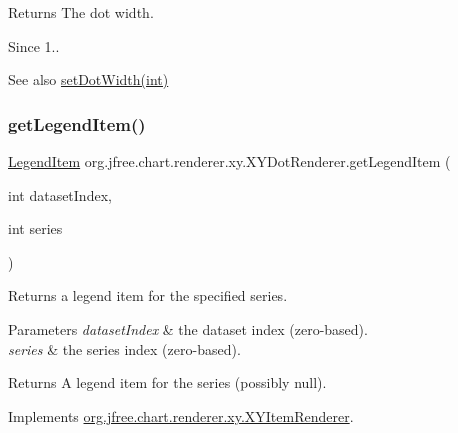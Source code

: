 \begin{DoxyReturn}{Returns}
The dot width.
\end{DoxyReturn}
\begin{DoxySince}{Since}
1.. 
\end{DoxySince}
\begin{DoxySeeAlso}{See also}
\mbox{\hyperlink{classorg_1_1jfree_1_1chart_1_1renderer_1_1xy_1_1_x_y_dot_renderer_a7c04419e31f770ce4ad7c59bb8ed6228}{set\+Dot\+Width(int)}} 
\end{DoxySeeAlso}
\mbox{\label{classorg_1_1jfree_1_1chart_1_1renderer_1_1xy_1_1_x_y_dot_renderer_ad9762d5dbf4d25f6090d37c25a6a63a5}} 
\subsubsection{\texorpdfstring{get\+Legend\+Item()}{getLegendItem()}}
{\footnotesize\ttfamily \mbox{\hyperlink{classorg_1_1jfree_1_1chart_1_1_legend_item}{Legend\+Item}} org.\+jfree.\+chart.\+renderer.\+xy.\+X\+Y\+Dot\+Renderer.\+get\+Legend\+Item (\begin{DoxyParamCaption}\item[{int}]{dataset\+Index,  }\item[{int}]{series }\end{DoxyParamCaption})}

Returns a legend item for the specified series.


\begin{DoxyParams}{Parameters}
{\em dataset\+Index} & the dataset index (zero-\/based). \\
\hline
{\em series} & the series index (zero-\/based).\\
\hline
\end{DoxyParams}
\begin{DoxyReturn}{Returns}
A legend item for the series (possibly {\ttfamily null}). 
\end{DoxyReturn}


Implements \mbox{\hyperlink{interfaceorg_1_1jfree_1_1chart_1_1renderer_1_1xy_1_1_x_y_item_renderer_a792c3e8c39bf57711528cd8064d2ddb5}{org.\+jfree.\+chart.\+renderer.\+xy.\+X\+Y\+Item\+Renderer}}.


